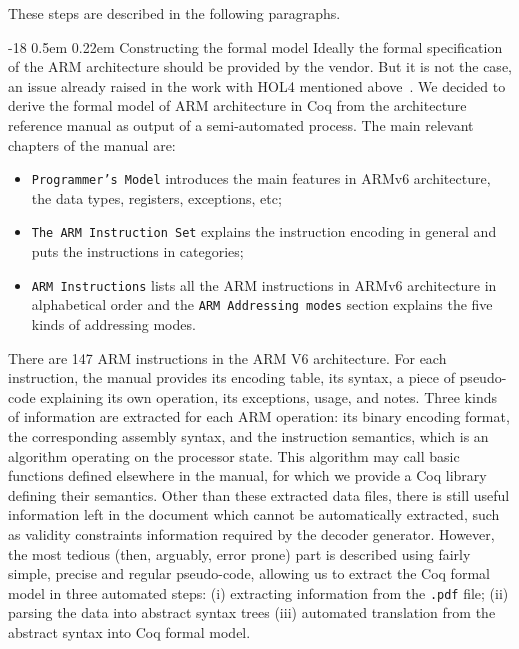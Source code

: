 \documentclass{llncs}
\makeatletter
\renewcommand\subsubsection{\@startsection{subsubsection}{3}{\z@}%
                       {-18\p@ \@plus -4\p@ \@minus -4\p@}%
                       {0.5em \@plus 0.22em}%
                       {\normalfont\normalsize\bfseries\boldmath}}
\makeatother
\begin{document}
These steps are described in the following paragraphs.


\subsubsection{Constructing the formal model}
Ideally the formal specification of the ARM architecture should be
provided by the vendor. But it is not the case,
an issue already raised
in the work with HOL4 mentioned above~\cite{FoxM10}.
We decided to derive
the formal
model of ARM architecture in Coq from the architecture
reference manual as output of a semi-automated process. The main
relevant chapters of the manual are:
\begin{itemize}
\item
\texttt{Programmer's Model} introduces the main features in ARMv6 architecture,
the data types, registers, exceptions, etc;
\item
\texttt{The ARM Instruction Set}
explains the instruction encoding in general and puts the instructions in
categories;
\item \texttt{ARM Instructions} lists all the ARM instructions in
  ARMv6 architecture in alphabetical order and the \texttt{ARM
    Addressing modes} section explains the five kinds of
  addressing modes.
\end{itemize}

There are 147 ARM instructions in the ARM V6 architecture.  For each
instruction, the manual provides its encoding table, its syntax, a
piece of pseudo-code explaining its own operation, its exceptions,
usage, and notes.
%
Three kinds of information are extracted for each ARM operation: its
binary encoding format, the corresponding assembly syntax, and the
instruction semantics, which is an algorithm operating on
the processor state. This algorithm may call basic functions defined
elsewhere in the manual, for which we provide a Coq library defining
their semantics. Other than these extracted data files, there is still
useful information left in the document which cannot be automatically
extracted, such as validity constraints information required by the
decoder generator.  However, the most tedious (then, arguably, error
prone) part is described using fairly simple, precise and regular
pseudo-code, allowing us to extract the Coq formal model in three
automated steps: (i) extracting information from the \texttt{.pdf}
file;
(ii) parsing the
data into abstract syntax trees
(iii) automated translation from the abstract syntax into Coq formal
model.
\end{document}
